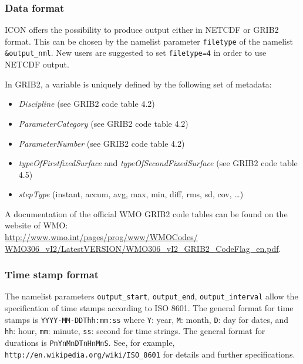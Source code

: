  

\subsubsection{Data format}


ICON offers the possibility to produce output either in NETCDF or GRIB2 format. This can be chosen by the namelist parameter \verb+filetype+ of the namelist \verb+&output_nml+. New users are suggested to set \verb+filetype=4+ in order to use NETCDF output.

In GRIB2, a variable is uniquely defined by the following set of metadata:
\begin{itemize}
 \item \textit{Discipline} (see GRIB2 code table 4.2)
 \item \textit{ParameterCategory} (see GRIB2 code table 4.2)
 \item \textit{ParameterNumber} (see GRIB2 code table 4.2)
 \item \textit{typeOfFirstfixedSurface} and \textit{typeOfSecondFixedSurface} (see GRIB2 code table 4.5)
 \item \textit{stepType} (instant, accum, avg, max, min, diff, rms, sd, cov, \dots)
\end{itemize}
A documentation of the official WMO GRIB2 code tables can be found on the website of WMO: \\ \href{http://www.wmo.int/pages/prog/www/WMOCodes/WMO306_vI2/LatestVERSION/WMO306_vI2_GRIB2_CodeFlag_en.pdf} {http://www.wmo.int/pages/prog/www/WMOCodes/ \\ WMO306\_vI2/LatestVERSION/WMO306\_vI2\_GRIB2\_CodeFlag\_en.pdf}.\\



\subsubsection{Time stamp format}


The namelist parameters \texttt{output\_start}, \texttt{output\_end}, \texttt{output\_interval} allow
the specification of time stamps according to ISO 8601.
The general format for time stamps is \texttt{YYYY-MM-DDThh:mm:ss}
where \texttt{Y}: year, \texttt{M}: month, \texttt{D}: day for dates, 
and   \texttt{hh}: hour, \texttt{mm}: minute, \texttt{ss}: second for time strings.  
The general format for durations is \texttt{PnYnMnDTnHnMnS}.
See, for example, \texttt{http://en.wikipedia.org/wiki/ISO\_8601} for details and further specifications.

